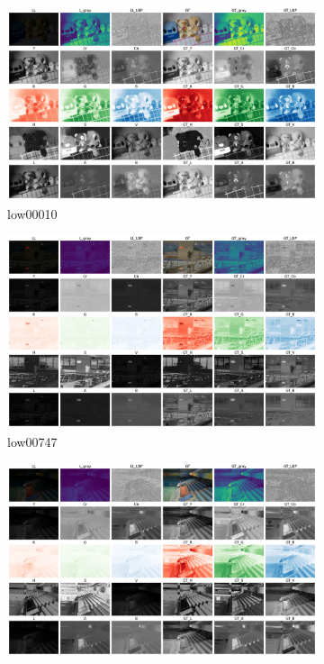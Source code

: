 \documentclass[a4paper]{ctexart}
\begin{document}
	\begin{figure}[htbp]
		\centering
		\begin{subfigure}{0.3\textwidth}
			\includegraphics[width=\linewidth]{picture/LLIE/Experiment/myplot_different_color_channels_low00010}
			\captionsetup{font=scriptsize}
			\caption{low00010}
			\label{fig: myplot_different_color_channels_low00010}	
		\end{subfigure}
		\begin{subfigure}{0.3\textwidth}
			\includegraphics[width=\linewidth]{picture/LLIE/Experiment/myplot_different_color_channels_low00747}
			\captionsetup{font=scriptsize}
			\caption{low00747}
			\label{fig: myplot_different_color_channels_low00747}	
		\end{subfigure}
		\begin{subfigure}{0.3\textwidth}
			\includegraphics[width=\linewidth]{picture/LLIE/Experiment/myplot_different_color_channels_low00776}

\end{subfigure}
\end{figure}
\end{document}

